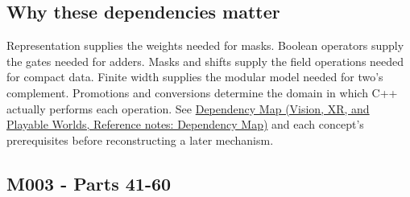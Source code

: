 \subsection{Why these dependencies matter}\label{appendix-fd090d982a15-why-these-dependencies-matter}

\hypertarget{appendix-fd090d982a15-why-these-dependencies-matter}{}

Representation supplies the weights needed for masks. Boolean operators supply the gates needed for adders. Masks and shifts supply the field operations needed for compact data. Finite width supplies the modular model needed for two's complement. Promotions and conversions determine the domain in which C++ actually performs each operation. See \href{../07-Vision-XR-and-Playable-Worlds/main.pdf\#nameddest=appendix-4ad47bdd269a}{Dependency Map (Vision, XR, and Playable Worlds, Reference notes: Dependency Map)} and each concept's prerequisites before reconstructing a later mechanism.

\subsection{M003 - Parts 41-60}\label{appendix-fd090d982a15-m003---parts-41-60}

\hypertarget{appendix-fd090d982a15-m003---parts-41-60}{}

